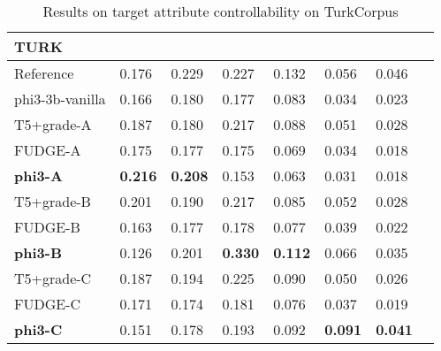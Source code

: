 \begin{table*}[t!]
    \small
    \centering
   \begin{adjustbox}{width=0.9\textwidth}
    \begin{tabular}{l L L L L L L L} \hline
     \textbf{TURK} &  &  &   &  &   &     \\ \hline
     Reference & 0.176 & 0.229 & 0.227 & 0.132  & 0.056 & 0.046  \\ 
     phi3-3b-vanilla &0.166 & 0.180 & 0.177 &0.083  &0.034 & 0.023 \\\hline
       T5+grade-A & 0.187 & 0.180 & 0.217 & 0.088  &0.051 & 0.028 \\
         
        FUDGE-A & 0.175 & 0.177 & 0.175 & 0.069  &0.034 & 0.018 \\
       
       \textbf{phi3-A} & \textbf{0.216} & \textbf{0.208} & 0.153 & 0.063  & 0.031 & 0.018 \\ \hline
       
       T5+grade-B & 0.201 & 0.190  & 0.217  &0.085 & 0.052 & 0.028 \\
    
    FUDGE-B & 0.163 & 0.177 & 0.178 & 0.077  &0.039 & 0.022 \\
       
        \textbf{phi3-B} & 0.126 & 0.201 & \textbf{0.330} & \textbf{0.112}  & 0.066 & 0.035 \\ \hline
        
      T5+grade-C & 0.187 & 0.194  & 0.225  &0.090 & 0.050 & 0.026 \\
       
       FUDGE-C  & 0.171 & 0.174 & 0.181 & 0.076  &0.037 & 0.019 \\        
       
        \textbf{phi3-C} & 0.151 & 0.178 & 0.193 & 0.092  & \textbf{0.091}  & \textbf{0.041} \\  \hline
        
    \end{tabular}
   \end{adjustbox}
    \caption{Results on target attribute controllability on TurkCorpus }
    \label{tab:turk1}
\end{table*}

